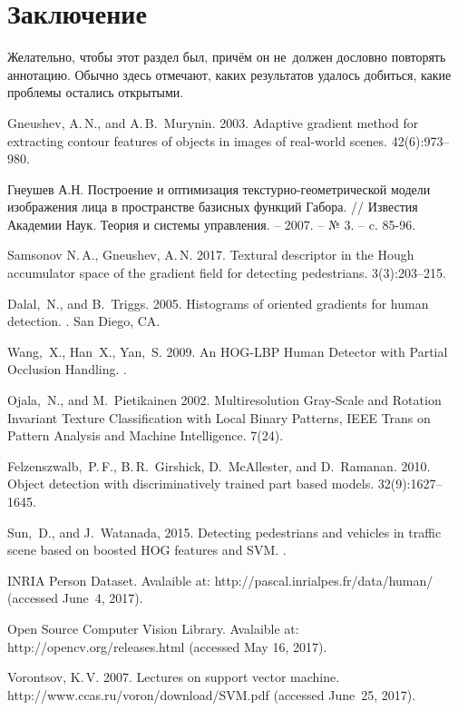 \documentclass[12pt,twoside]{article}
\begin{document}
\section{Заключение}
Желательно, чтобы этот раздел был, причём он не~должен дословно повторять аннотацию.
Обычно здесь отмечают,
каких результатов удалось добиться,
какие проблемы остались открытыми.

\bigskip
\maketitleSecondary




\begin{thebibliography}{99}
Gneushev, A.\,N., and A.\,B.~Murynin.	
2003. Adaptive gradient method for extracting contour features of
objects in images of real-world scenes.
 42(6):973--980.

Гнеушев А.Н. Построение и оптимизация текстурно-геометрической модели изображения лица в пространстве базисных функций Габора. // Известия Академии Наук. Теория и системы управления. – 2007. – № 3. – c. 85-96.

Samsonov N.\,A., Gneushev, A.\,N.	
2017. Textural descriptor in the Hough accumulator space of the gradient field for detecting pedestrians.
 3(3):203--215.

Dalal,~N., and B.~Triggs. 2005.
 Histograms of oriented gradients for
human detection. . San Diego, CA.

Wang,~X., Han~X., Yan,~S. 2009.
 An HOG-LBP Human Detector with Partial Occlusion Handling. .

Ojala,~N., and M.~Pietikainen 2002.
 Multiresolution Gray-Scale and Rotation Invariant Texture Classification with Local Binary Patterns, IEEE Trans on Pattern Analysis and Machine Intelligence.
 7(24).
 
	{Felzenszwalb,~P.\,F., B.\,R.~Girshick, D.~McAllester,
	and D.~Ramanan}. 2010.
	Object detection with discriminatively trained part based models.
 32(9):1627--1645.

	{Sun,~D., and J.~Watanada}, 2015.
	Detecting pedestrians and vehicles in traffic scene based on
	boosted HOG features and SVM.
.

	INRIA Person Dataset.
	Avalaible at: {\sf http://pascal.inrialpes.fr/data/human/}
	(accessed June~4, 2017).

	Open Source Computer Vision Library.
	Avalaible at: {\sf http://opencv.org/releases.html}
	(accessed May 16, 2017).
	
	Vorontsov, K.\,V. 2007. Lectures on support vector machine.
	{\sf http://www.ccas.ru/voron/download/\linebreak SVM.pdf}
	(accessed June~25, 2017).
	

\end{thebibliography}

\end{document}
